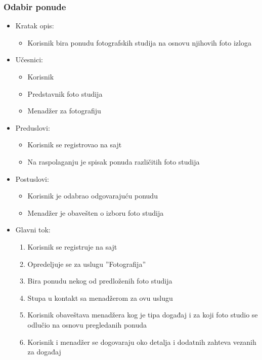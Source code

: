 \documentclass[a4paper]{article}
\begin{document}
\subsubsection{Odabir ponude}
\begin{itemize}
    \item Kratak opis: 
    \begin{itemize}
        \item Korisnik bira ponudu fotografskih studija na osnovu njihovih foto izloga
    \end{itemize}
    \item Učesnici:
        \begin{itemize}
        \item Korisnik
        \item Predstavnik foto studija
        \item Menadžer za fotografiju
    \end{itemize}
    \item Preduslovi:
        \begin{itemize}
            \item Korisnik se registrovao na sajt
            \item Na raspolaganju je spisak ponuda različitih foto studija
        \end{itemize}
    \item Postuslovi:
        \begin{itemize}
            \item Korisnik je odabrao odgovarajuću ponudu
            \item Menadžer je obavešten o izboru foto studija
        \end{itemize}
    \item Glavni tok:
        \begin{enumerate}
            \item Korisnik se registruje na sajt
            \item Opredeljuje se za uslugu ''Fotografija''
            \item Bira ponudu nekog od predloženih foto studija
            \item Stupa u kontakt sa menadžerom za ovu uslugu
            \item Korisnik obaveštava menadžera kog je tipa događaj i za koji foto studio se odlučio na osnovu pregledanih ponuda 
            \item Korisnik i menadžer se dogovaraju oko detalja i dodatnih zahteva vezanih za događaj
        \end{enumerate}

\end{itemize}
\end{document}
